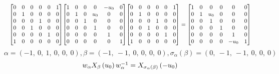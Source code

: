 \documentclass[11pt]{article}
\theoremstyle{definition}
\begin{document}
\[
\scaletoalign{\textwidth}{{\left[\begin{matrix}0 & 0 & 0 & 0 & 0 & 1\\0 & 1 & 0 & 0 & 0 & 0\\0 & 0 & 0 & 1 & 0 & 0\\0 & 0 & 1 & 0 & 0 & 0\\0 & 0 & 0 & 0 & 1 & 0\\1 & 0 & 0 & 0 & 0 & 0\end{matrix}\right]} {\left[\begin{matrix}1 & 0 & 0 & 0 & - u_{0} & 0\\0 & 1 & 0 & u_{0} & 0 & 0\\0 & 0 & 1 & 0 & 0 & 0\\0 & 0 & 0 & 1 & 0 & 0\\0 & 0 & 0 & 0 & 1 & 0\\0 & 0 & 0 & 0 & 0 & 1\end{matrix}\right]} {\left[\begin{matrix}0 & 0 & 0 & 0 & 0 & 1\\0 & 1 & 0 & 0 & 0 & 0\\0 & 0 & 0 & 1 & 0 & 0\\0 & 0 & 1 & 0 & 0 & 0\\0 & 0 & 0 & 0 & 1 & 0\\1 & 0 & 0 & 0 & 0 & 0\end{matrix}\right]} = {\left[\begin{matrix}1 & 0 & 0 & 0 & 0 & 0\\0 & 1 & u_{0} & 0 & 0 & 0\\0 & 0 & 1 & 0 & 0 & 0\\0 & 0 & 0 & 1 & 0 & 0\\0 & 0 & 0 & 0 & 1 & 0\\0 & 0 & 0 & 0 & - u_{0} & 1\end{matrix}\right]}}
\]
\[
\alpha = \left( -1, \  0, \  1, \  0, \  0, \  0\right), \beta = \left( -1, \  -1, \  0, \  0, \  0, \  0\right), \sigma_{\alpha}(\beta) = \left( 0, \  -1, \  -1, \  0, \  0, \  0\right)
\]
\[
\scaletoalign{\textwidth}{w_{\alpha} X_{\beta}\left(u_{0}\right) w_{\alpha}^{-1} = X_{\sigma_{\alpha}\left(\beta\right)}\left(- u_{0}\right)}
\]
\end{document}
